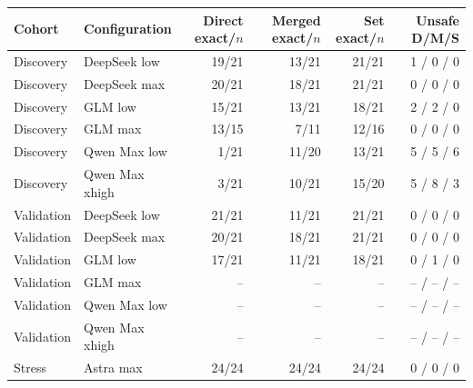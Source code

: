 \begin{tabular}{@{}llrrrr@{}}
\toprule
Cohort & Configuration & Direct exact/$n$ & Merged exact/$n$ & Set exact/$n$ & Unsafe D/M/S\\
\midrule
Discovery & DeepSeek low & 19/21 & 13/21 & 21/21 & 1 / 0 / 0\\
Discovery & DeepSeek max & 20/21 & 18/21 & 21/21 & 0 / 0 / 0\\
Discovery & GLM low & 15/21 & 13/21 & 18/21 & 2 / 2 / 0\\
Discovery & GLM max & 13/15 & 7/11 & 12/16 & 0 / 0 / 0\\
Discovery & Qwen Max low & 1/21 & 11/20 & 13/21 & 5 / 5 / 6\\
Discovery & Qwen Max xhigh & 3/21 & 10/21 & 15/20 & 5 / 8 / 3\\
\midrule
Validation & DeepSeek low & 21/21 & 11/21 & 21/21 & 0 / 0 / 0\\
Validation & DeepSeek max & 20/21 & 18/21 & 21/21 & 0 / 0 / 0\\
Validation & GLM low & 17/21 & 11/21 & 18/21 & 0 / 1 / 0\\
Validation & GLM max & -- & -- & -- & -- / -- / --\\
Validation & Qwen Max low & -- & -- & -- & -- / -- / --\\
Validation & Qwen Max xhigh & -- & -- & -- & -- / -- / --\\
\midrule
Stress & Astra max & 24/24 & 24/24 & 24/24 & 0 / 0 / 0\\
\bottomrule
\end{tabular}
